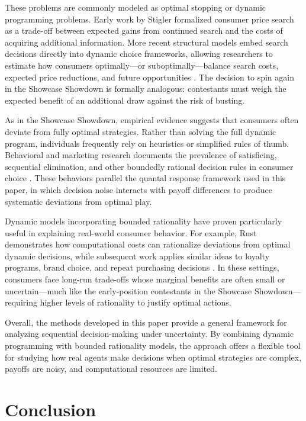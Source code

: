 \documentclass[titlepage,12pt]{article}
\begin{document}
These problems are commonly modeled as optimal stopping or dynamic programming problems. Early work by Stigler \cite{Stigler1961} formalized consumer price search as a trade-off between expected gains from continued search and the costs of acquiring additional information. More recent structural models embed search decisions directly into dynamic choice frameworks, allowing researchers to estimate how consumers optimally—or suboptimally—balance search costs, expected price reductions, and future opportunities \cite{Honka2014,DeLosSantos2012}. The decision to spin again in the Showcase Showdown is formally analogous: contestants must weigh the expected benefit of an additional draw against the risk of busting.

As in the Showcase Showdown, empirical evidence suggests that consumers often deviate from fully optimal strategies. Rather than solving the full dynamic program, individuals frequently rely on heuristics or simplified rules of thumb. Behavioral and marketing research documents the prevalence of satisficing, sequential elimination, and other boundedly rational decision rules in consumer choice \cite{Simon1955,Tversky1972}. These behaviors parallel the quantal response framework used in this paper, in which decision noise interacts with payoff differences to produce systematic deviations from optimal play.

Dynamic models incorporating bounded rationality have proven particularly useful in explaining real-world consumer behavior. For example, Rust \cite{Rust1987} demonstrates how computational costs can rationalize deviations from optimal dynamic decisions, while subsequent work applies similar ideas to loyalty programs, brand choice, and repeat purchasing decisions \cite{Sun2005}. In these settings, consumers face long-run trade-offs whose marginal benefits are often small or uncertain—much like the early-position contestants in the Showcase Showdown—requiring higher levels of rationality to justify optimal actions.

Overall, the methods developed in this paper provide a general framework for analyzing sequential decision-making under uncertainty. By combining dynamic programming with bounded rationality models, the approach offers a flexible tool for studying how real agents make decisions when optimal strategies are complex, payoffs are noisy, and computational resources are limited.


\section{Conclusion}
\end{document}
